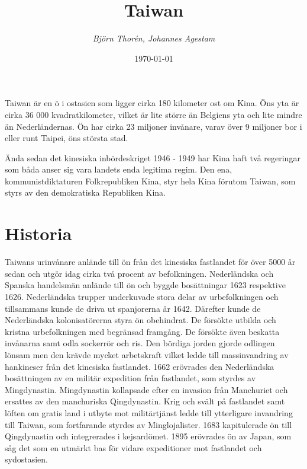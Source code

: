 \documentclass[a4paper,10pt]{article}
\title{\Huge\bf{Taiwan}\\}
\author{\emph{Björn Thorén, Johannes Agestam}}
\date{\today}
\begin{document}
\maketitle




Taiwan är en ö i ostasien som ligger cirka 180 kilometer ost om Kina. Öns yta är cirka 36 000 kvadratkilometer, vilket är lite större än Belgiens yta och lite mindre än Nederländernas. Ön har cirka 23 miljoner invånare, varav över 9 miljoner bor i eller runt Taipei, öns största stad. 

Ända sedan det kinesiska inbördeskriget 1946 - 1949 har Kina haft två regeringar som båda anser sig vara landets enda legitima regim. Den ena, kommunistdiktaturen Folkrepubliken Kina, styr hela Kina förutom Taiwan, som styrs av den demokratiska Republiken Kina.



\section*{Historia}
Taiwans urinvånare anlände till ön från det kinesiska fastlandet för över 5000 år sedan och utgör idag cirka två procent av befolkningen. Nederländska och Spanska handelsmän anlände till ön och byggde bosättningar 1623 respektive 1626. Nederländska trupper underkuvade stora delar av urbefolkningen och tillsammans kunde de driva ut spanjorerna år 1642. Därefter kunde de Nederländska kolonisatörerna styra ön obehindrat. De försökte utbilda och kristna urbefolkningen med begränsad framgång. De försökte även beskatta invånarna samt odla sockerrör och ris. Den bördiga jorden gjorde odlingen lönsam men den krävde mycket arbetskraft vilket ledde till massinvandring av hankineser från det kinesiska fastlandet. 1662 erövrades den Nederländska bosättningen av en militär expedition från fastlandet, som styrdes av Mingdynastin. Mingdynastin kollapsade efter en invasion från Manchuriet och ersattes av den manchuriska Qingdynastin. Krig och svält på fastlandet samt löften om gratis land i utbyte mot militärtjänst ledde till ytterligare invandring till Taiwan, som fortfarande styrdes av Minglojalister. 1683 kapitulerade ön till Qingdynastin och integrerades i kejsardömet. 1895 erövrades ön av Japan, som såg det som en utmärkt bas för vidare expeditioner mot fastlandet och sydostasien.
\end{document}
